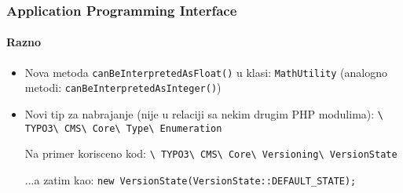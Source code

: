 \begin{frame}[fragile]
	\frametitle{Application Programming Interface}
	\framesubtitle{Razno}

	\begin{itemize}
		\item Nova metoda \texttt{canBeInterpretedAsFloat()} u klasi: \texttt{MathUtility}\newline
			\small(analogno metodi: \texttt{canBeInterpretedAsInteger()})\normalsize
		\item Novi tip za nabrajanje (nije u relaciji sa nekim drugim PHP modulima):\newline
			\texttt{\textbackslash
				TYPO3\textbackslash
				CMS\textbackslash
				Core\textbackslash
				Type\textbackslash
				Enumeration}\newline

			Na primer korisceno kod:\newline
			\texttt{\textbackslash
				TYPO3\textbackslash
				CMS\textbackslash
				Core\textbackslash
				Versioning\textbackslash
				VersionState}\newline

			...a zatim kao:\newline
			\texttt{new VersionState(VersionState::DEFAULT\_STATE);}

	\end{itemize}

\end{frame}


